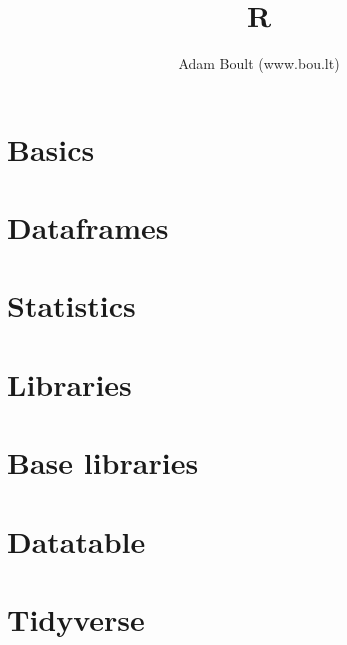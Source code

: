 \documentclass[oneside]{book}
\begin{document}
\author{Adam Boult (www.bou.lt)}
\title{R}
\maketitle

\setcounter{tocdepth}{0}
\tableofcontents



\part{Basics}







\part{Dataframes}


\part{Statistics}

\part{Libraries}

\part{Base libraries}

\part{Datatable}


\part{Tidyverse}







\end{document}
